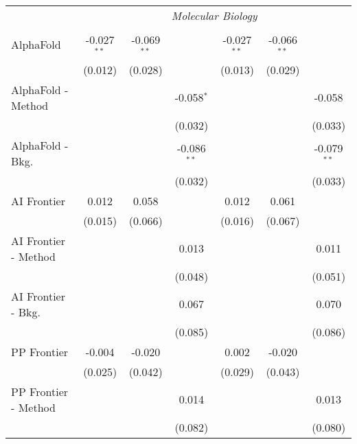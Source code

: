 \begin{tabular}{lcccccc}
 & \multicolumn{6}{c}{\textit{Molecular Biology}} \\ \\
   AlphaFold            & -0.027$^{**}$ & -0.069$^{**}$ &               & -0.027$^{**}$ & -0.066$^{**}$ &   \\   
                        & (0.012)       & (0.028)       &               & (0.013)       & (0.029)       &   \\   
   AlphaFold - Method   &               &               & -0.058$^{*}$  &               &               & -0.058\\   
                        &               &               & (0.032)       &               &               & (0.033)\\   
   AlphaFold - Bkg.     &               &               & -0.086$^{**}$ &               &               & -0.079$^{**}$\\   
                        &               &               & (0.032)       &               &               & (0.033)\\   
   AI Frontier          & 0.012         & 0.058         &               & 0.012         & 0.061         &   \\   
                        & (0.015)       & (0.066)       &               & (0.016)       & (0.067)       &   \\   
   AI Frontier - Method &               &               & 0.013         &               &               & 0.011\\   
                        &               &               & (0.048)       &               &               & (0.051)\\   
   AI Frontier - Bkg.   &               &               & 0.067         &               &               & 0.070\\   
                        &               &               & (0.085)       &               &               & (0.086)\\   
   PP Frontier          & -0.004        & -0.020        &               & 0.002         & -0.020        &   \\   
                        & (0.025)       & (0.042)       &               & (0.029)       & (0.043)       &   \\   
   PP Frontier - Method &               &               & 0.014         &               &               & 0.013\\   
                        &               &               & (0.082)       &               &               & (0.080)\\   

\end{tabular}
